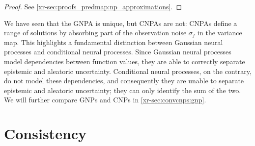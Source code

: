 \documentclass[12pt, twoside]{report}
\newcommand{\xrprefix}[1]{xr-#1}
\begin{document}
\begingroup
    \newcommand{\possibleprefix}[1]{#1}
\endgroup

\begin{proof}
    See \cref{\xrprefix{sec:proofs_predmap:np_approximations}}.
\end{proof}

We have seen that the GNPA is unique, but CNPAs are not:
CNPAs define a range of solutions by absorbing part of the observation noise $\sigma_f$ in the variance map.
This highlights a fundamental distinction between Gaussian neural processes and conditional neural processes.
Since Gaussian neural processes model dependencies between function values, they are able to correctly separate epistemic and aleatoric uncertainty.
Conditional neural processes, on the contrary, do not model these dependencies, and consequently they are unable to separate epistemic and aleatoric uncertainty;
they can only identify the sum of the two.
We will further compare GNPs and CNPs in \cref{\xrprefix{sec:convcnps:gnp}}.

\section{Consistency}
\label{sec:predmap:consistency}
\end{document}
